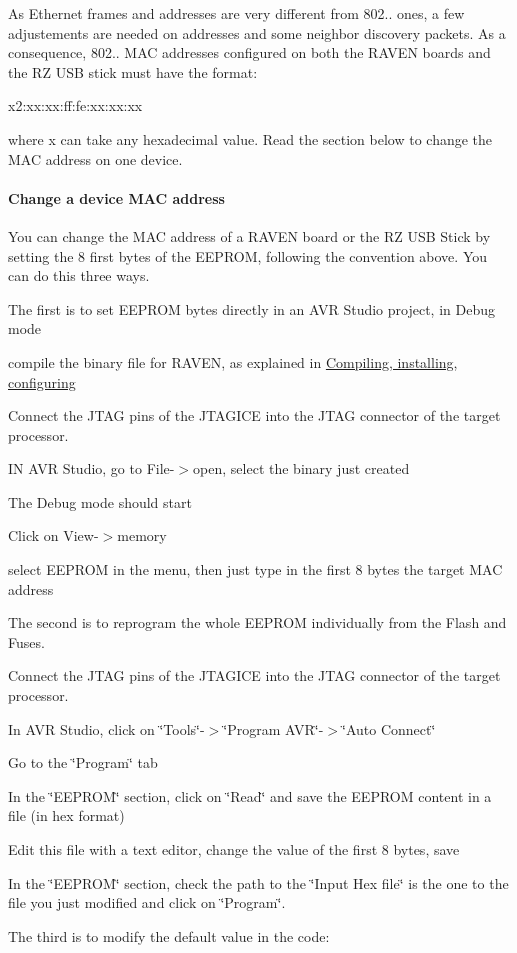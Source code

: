 As Ethernet frames and addresses are very different from 802.. ones, a few adjustements are needed on addresses and some neighbor discovery packets. As a consequence, 802.. M\+AC addresses configured on both the R\+A\+V\+EN boards and the RZ U\+SB stick must have the format\+:~\newline
 \begin{DoxyVerb}x2:xx:xx:ff:fe:xx:xx:xx
\end{DoxyVerb}
 where x can take any hexadecimal value. Read the section below to change the M\+AC address on one device.\hypertarget{a00072_advanced_eeprom}{}\paragraph{Change a device M\+A\+C address}\label{a00072_advanced_eeprom}
You can change the M\+AC address of a R\+A\+V\+EN board or the RZ U\+SB Stick by setting the 8 first bytes of the E\+E\+P\+R\+OM, following the convention above. You can do this three ways.

The first is to set E\+E\+P\+R\+OM bytes directly in an A\+VR Studio project, in Debug mode

\begin{DoxyItemize}
\item compile the binary file for R\+A\+V\+EN, as explained in \hyperlink{a00072_installation}{Compiling, installing, configuring} \item Connect the J\+T\+AG pins of the J\+T\+A\+G\+I\+CE into the J\+T\+AG connector of the target processor. \item IN A\+VR Studio, go to File-\/$>$open, select the binary just created \item The Debug mode should start \item Click on View-\/$>$memory \item select E\+E\+P\+R\+OM in the menu, then just type in the first 8 bytes the target M\+AC address\end{DoxyItemize}
The second is to reprogram the whole E\+E\+P\+R\+OM individually from the Flash and Fuses.

\begin{DoxyItemize}
\item Connect the J\+T\+AG pins of the J\+T\+A\+G\+I\+CE into the J\+T\+AG connector of the target processor. \item In A\+VR Studio, click on \char`\"{}\+Tools\char`\"{}-\/$>$\char`\"{}\+Program A\+V\+R\char`\"{}-\/$>$\char`\"{}\+Auto Connect\char`\"{} \item Go to the \char`\"{}\+Program\char`\"{} tab \item In the \char`\"{}\+E\+E\+P\+R\+O\+M\char`\"{} section, click on \char`\"{}\+Read\char`\"{} and save the E\+E\+P\+R\+OM content in a file (in hex format) \item Edit this file with a text editor, change the value of the first 8 bytes, save \item In the \char`\"{}\+E\+E\+P\+R\+O\+M\char`\"{} section, check the path to the \char`\"{}\+Input Hex file\char`\"{} is the one to the file you just modified and click on \char`\"{}\+Program\char`\"{}.\end{DoxyItemize}
The third is to modify the default value in the code\+:

